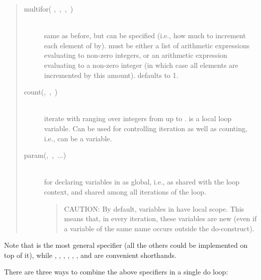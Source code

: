 \begin{quote}
\begin{description}
\item[multifor(%
,~,~,~)]%
\mbox{}\\
    same as before, but  can be specified (i.e., how
    much to increment each element of  by).
     must be
    either a list of arithmetic expressions evaluating to non-zero
    integers, or an arithmetic expression evaluating to a non-zero
    integer (in which case all elements are incremented by this
    amount).   defaults to 1.

\item[count(,~,~)]%
\mbox{}\\
    iterate  with  ranging over integers from 
    up to .
     is a local loop variable.
    Can be used for controlling iteration as well as counting,
    i.e.,  can be a variable.

\item[param(,~,~...)]%
\mbox{}\\
    for declaring variables in  as global, i.e., as shared with
    the loop context, and shared among all iterations of the loop.
    \begin{quotation}
    CAUTION: By default, variables in  have local scope.
    This means that, in every iteration, these variables are new (even if a variable
    of the same name occurs outside the do-construct).
    \end{quotation}
\end{description}
\end{quote}

Note that  is the most general specifier (all the others
could be implemented on top of it), while ,
,
, , ,
,  and
 are convenient shorthands.

There are three ways to combine the above specifiers in a single do loop:

